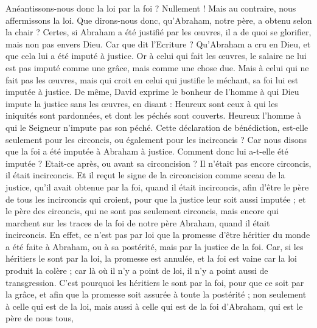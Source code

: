 \begin{multicols}{2}
Anéantissons-nous donc la loi par la foi ? Nullement ! Mais au contraire, nous affermissons la loi.
\VerseOne{}Que dirons-nous donc, qu'Abraham, notre père, a obtenu selon la chair ?
Certes, si Abraham a été justifié par les œuvres, il a de quoi se glorifier, mais non pas envers Dieu.
Car que dit l'Ecriture ? Qu’Abraham a cru en Dieu, et que cela lui a été imputé à justice.
Or à celui qui fait les œuvres, le salaire ne lui est pas imputé comme une grâce, mais comme une chose due.
Mais à celui qui ne fait pas les œuvres, mais qui croit en celui qui justifie le méchant, sa foi lui est imputée à justice.
De même, David exprime le bonheur de l'homme à qui Dieu impute la justice sans les œuvres, en disant :
Heureux sont ceux à qui les iniquités sont pardonnées, et dont les péchés sont couverts.
Heureux l'homme à qui le Seigneur n’impute pas son péché.
Cette déclaration de bénédiction, est-elle seulement pour les circoncis, ou également pour les incirconcis ? Car nous disons que la foi a été imputée à Abraham à justice.
Comment donc lui a-t-elle été imputée ? Etait-ce après, ou avant sa circoncision ? Il n’était pas encore circoncis, il était incirconcis.
Et il reçut le signe de la circoncision comme sceau de la justice, qu’il avait obtenue par la foi, quand il était incirconcis, afin d’être le père de tous les incirconcis qui croient, pour que la justice leur soit aussi imputée ;
et le père des circoncis, qui ne sont pas seulement circoncis, mais encore qui marchent sur les traces de la foi de notre père Abraham, quand il était incirconcis.
En effet, ce n’est pas par loi que la promesse d'être héritier du monde a été faite à Abraham, ou à sa postérité, mais par la justice de la foi.
Car, si les héritiers le sont par la loi, la promesse est annulée, et la foi est vaine
car la loi produit la colère ; car là où il n'y a point de loi, il n'y a point aussi de transgression.
C'est pourquoi les héritiers le sont par la foi, pour que ce soit par la grâce, et afin que la promesse soit assurée à toute la postérité ; non seulement à celle qui est de la loi, mais aussi à celle qui est de la foi d'Abraham, qui est le père de nous tous,

\end{multicols}
